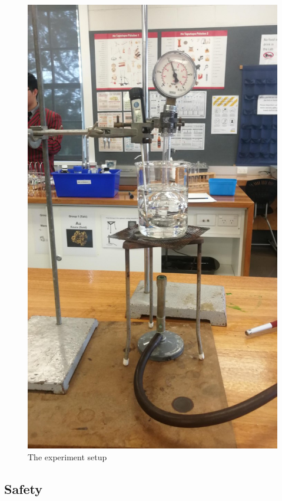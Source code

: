 \documentclass[a4paper,12pt]{article}
\begin{document}
\begin{figure}[H]
 \centering
 \includegraphics[scale=0.4]{assets/setup.jpg}
 \caption{The experiment setup}
 \label{fig:exp}
\end{figure}




\subsection{Safety}
\end{document}
